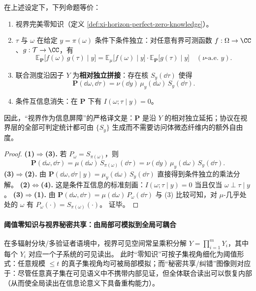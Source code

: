 \begin{theorem}\label{thm:xi-horizon-perfect-zk-equivalences}
在上述设定下，下列命题等价：
\begin{enumerate}
  \item 视界完美零知识（定义 \ref{def:xi-horizon-perfect-zero-knowledge}）。
  \item \(\tau\) 与 \(\omega\) 在给定 \(y=\pi(\omega)\) 条件下条件独立：对任意有界可测函数 \(f:\Omega\to\CC\)、\(g:\mathcal{T}\to\CC\)，有
  \[
  \mathbb{E}_{\mathbf{P}}\bigl[f(\omega)\,g(\tau)\mid y\bigr]
  =
  \mathbb{E}_{\mu}\bigl[f(\omega)\mid y\bigr]\cdot
  \mathbb{E}_{\mathbf{P}}\bigl[g(\tau)\mid y\bigr]
  \quad(\nu\text{-a.e. }y).
  \]
  \item 联合测度沿因子 \(Y\) 为\textbf{相对独立拼接}：存在核 \(S_y(\dd\tau)\) 使得
  \[
  \mathbf{P}(\dd\omega,\dd\tau)
  =
  \nu(\dd y)\,\mu_y(\dd\omega)\,S_y(\dd\tau).
  \]
  \item 条件互信息消失：在 \(\mathbf{P}\) 下有 \(I(\omega;\tau\mid y)=0\)。
\end{enumerate}
因此，“视界作为信息屏障”的严格译文是：\(\mathbf{P}\) 是沿 \(Y\) 的相对独立延拓；协议在视界层的全部可判定统计都可由 \(\{S_y\}\) 生成而不需要访问体微态纤维内的额外自由度。
\end{theorem}

\begin{proof}
\textbf{(1)\(\Rightarrow\)(3).}
若 \(P_{\omega}=S_{\pi(\omega)}\)，则
\[
\mathbf{P}(\dd\omega,\dd\tau)
=
\mu(\dd\omega)\,S_{\pi(\omega)}(\dd\tau)
=
\nu(\dd y)\,\mu_y(\dd\omega)\,S_y(\dd\tau).
\]
\textbf{(3)\(\Rightarrow\)(2).}
由 \(\mathbf{P}(\dd\omega,\dd\tau\mid y)=\mu_y(\dd\omega)\,S_y(\dd\tau)\) 直接得到条件独立的乘法分解。
\textbf{(2)\(\Leftrightarrow\)(4).}
这是条件互信息的标准刻画：\(I(\omega;\tau\mid y)=0\) 当且仅当 \(\omega\perp \tau\mid y\)。
\textbf{(3)\(\Rightarrow\)(1).}
由 \(\mathbf{P}(\dd\omega,\dd\tau)=\mu(\dd\omega)\,P_{\omega}(\dd\tau)\) 与 (3) 比较可知，对 \(\mu\)-几乎处处的 \(\omega\) 有 \(P_{\omega}(\cdot)=S_{\pi(\omega)}(\cdot)\)。
证毕。
\end{proof}

\paragraph{阈值零知识与视界秘密共享：由局部可模拟到全局可耦合}
在多辐射分块/多验证者语境中，视界可见空间常呈乘积分解 \(Y=\prod_{i=1}^{m}Y_i\)，其中每个 \(Y_i\) 对应一个子系统的可见读出。
此时“零知识”可按子集视角细化为阈值形式：任意规模 \(\le t\) 的真子集视角均可被局部模拟；而“秘密共享/纠错”图像则对应于：尽管任意真子集在可见语义中不携带内部见证，但全体联合读出可以恢复内部（从而使全局读出在信息论意义下具备重构能力）。

